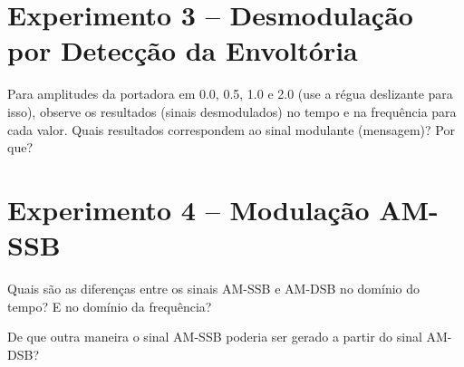 \documentclass[12pt,addpoints]{exam}
\begin{document}
\section*{Experimento 3 -- Desmodulação por Detecção da Envoltória}

\begin{questions}
    \question Para amplitudes da portadora em 0.0, 0.5, 1.0 e 2.0 (use  a régua deslizante para isso), observe os resultados (sinais desmodulados) no tempo e na frequência para cada valor. Quais resultados correspondem ao sinal modulante (mensagem)? Por que?
    \fillwithlines{0.75in}
\end{questions}

%
%    
%
%

\section*{Experimento 4 -- Modulação AM-SSB}

\begin{questions}
    \question Quais são as diferenças entre os sinais AM-SSB e AM-DSB no domínio do tempo? E no domínio da frequência?
    \fillwithlines{1.5in}
    
    \question De que outra maneira o sinal AM-SSB poderia ser gerado a partir do sinal AM-DSB?
    \fillwithlines{1.5in}
    
\end{questions}
\end{document}
